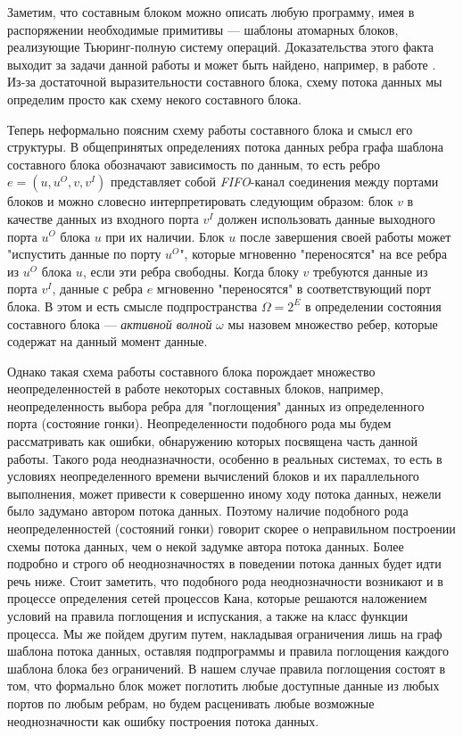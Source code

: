 \documentclass[10pt,a4paper]{article}
\begin{document}
Заметим, что составным блоком можно описать любую программу, имея в распоряжении необходимые примитивы --- шаблоны атомарных блоков,
реализующие Тьюринг-полную систему операций. Доказательства этого факта выходит за задачи данной работы и может быть найдено, например, в работе \cite{workflow-managment}.
Из-за достаточной выразительности составного блока, схему потока данных мы определим просто как схему некого составного блока.

Теперь неформально поясним схему работы составного блока и смысл его структуры.
В общепринятых определениях потока данных ребра графа шаблона составного блока обозначают зависимость по данным, то есть ребро $e = (u, u^O, v, v^I)$ представляет собой
\textit{FIFO}-канал соединения между портами блоков и
можно словесно интерпретировать следующим образом: блок $v$ в качестве данных из входного порта $v^I$ должен использовать данные выходного порта $u^O$ блока $u$ при их наличии.
Блок $u$ после завершения своей работы может "испустить данные по порту $u^O$", которые мгновенно "переносятся" на все ребра из $u^O$ блока $u$,
если эти ребра свободны.
Когда блоку $v$ требуются данные из порта $v^I$, данные с ребра $e$ мгновенно "переносятся" в соответствующий порт блока. В этом и есть смысле подпространства $\Omega = 2^E$
в определении состояния составного блока --- \textit{активной волной} $\omega$ мы назовем множество ребер, которые содержат на данный момент данные.

Однако такая схема работы составного блока порождает множество неопределенностей в работе некоторых составных блоков, например, неопределенность выбора ребра для "поглощения" данных из определенного порта (состояние гонки).
Неопределенности подобного рода мы будем рассматривать как ошибки, обнаружению которых посвящена часть данной работы. Такого рода неодназначности, особенно в реальных системах,
то есть в условиях неопределенного времени вычислений блоков и их параллельного выполнения, может привести к совершенно иному ходу потока данных, нежели было задумано автором потока данных.
Поэтому наличие подобного рода неопределенностей (состояний гонки) говорит скорее о неправильном построении схемы потока данных, чем о некой задумке автора потока данных.
Более подробно и строго об неоднозначностях в поведении потока данных будет идти речь ниже.
Стоит заметить, что подобного рода неоднозначности возникают и в процессе определения сетей процессов Кана,
которые решаются наложением условий на правила поглощения и испускания, а также на класс функции процесса.
Мы же пойдем другим путем, накладывая ограничения лишь на граф шаблона потока данных, оставляя подпрограммы и правила поглощения каждого шаблона блока без ограничений.
В нашем случае правила поглощения состоят в том, что формально блок может поглотить любые доступные данные из любых портов по любым ребрам,
но будем расценивать любые возможные неоднозначности как ошибку построения потока данных.
\end{document}
